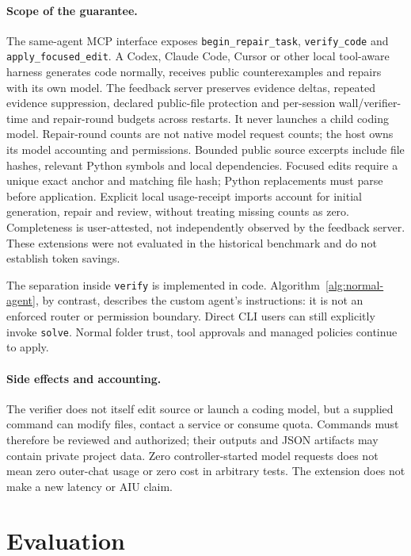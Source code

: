 \documentclass[10pt,twocolumn,a4paper]{article}
\begin{document}
\paragraph{Scope of the guarantee.}
The same-agent MCP interface exposes \texttt{begin\_repair\_task},
\texttt{verify\_code} and \texttt{apply\_focused\_edit}. A Codex, Claude Code, Cursor or other local tool-aware
harness generates code normally, receives public counterexamples and repairs
with its own model. The feedback server preserves evidence deltas, repeated
evidence suppression, declared public-file protection and per-session
wall/verifier-time and repair-round budgets across restarts. It never launches
a child coding model. Repair-round counts are not native model request counts;
the host owns its model accounting and permissions. Bounded public source
excerpts include file hashes, relevant Python symbols and local dependencies.
Focused edits require a unique exact anchor and matching file hash; Python
replacements must parse before application. Explicit local usage-receipt
imports account for initial generation, repair and review, without treating
missing counts as zero. Completeness is user-attested, not independently
observed by the feedback server. These extensions were not evaluated in the
historical benchmark and do not establish token savings.

The separation inside \texttt{verify} is implemented in code.
Algorithm~\ref{alg:normal-agent}, by contrast, describes the custom agent's
instructions: it is not an enforced router or permission boundary. Direct
CLI users can still explicitly invoke \texttt{solve}. Normal folder trust,
tool approvals and managed policies continue to apply.

\paragraph{Side effects and accounting.}
The verifier does not itself edit source or launch a coding model, but a
supplied command can modify files, contact a service or consume quota.
Commands must therefore be reviewed and authorized; their outputs and JSON
artifacts may contain private project data. Zero controller-started model
requests does not mean zero outer-chat usage or zero cost in arbitrary tests.
The extension does not make a new latency or AIU claim.

\section{Evaluation}
\end{document}
